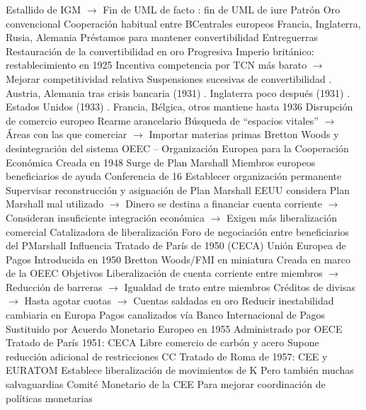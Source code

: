 \documentclass{nuevotema}
\begin{document}
\begin{esquemal}
				\4[] Estallido de IGM
				\4[] $\to$ Fin de UML de facto
				: fin de UML de iure
			\3 Patrón Oro convencional
				\4 Cooperación habitual entre BCentrales europeos
				\4 Francia, Inglaterra, Rusia, Alemania
				\4[] Préstamos para mantener convertibilidad
			\3 Entreguerras
				\4 Restauración de la convertibilidad en oro
				\4[] Progresiva
				\4[] Imperio británico: restablecimiento en 1925
				\4[] Incentiva competencia por TCN más barato
				\4[] $\to$ Mejorar competitividad relativa
				\4 Suspensiones sucesivas de convertibilidad
				. Austria, Alemania tras crisis bancaria (1931)
				. Inglaterra poco después (1931)
				. Estados Unidos (1933)
				. Francia, Bélgica, otros mantiene hasta 1936
				\4 Disrupción de comercio europeo
				\4[] Rearme arancelario
				\4[] Búsqueda de ``espacios vitales''
				\4[] $\to$ Áreas con las que comerciar
				\4[] $\to$ Importar materias primas
		\2 Bretton Woods y desintegración del sistema
			\3 OEEC -- Organización Europea para la Cooperación Económica
				\4 Creada en 1948
				\4 Surge de Plan Marshall
				\4[] Miembros europeos beneficiarios de ayuda
				\4 Conferencia de 16
				\4[] Establecer organización permanente
				\4[] Supervisar reconstrucción y asignación de Plan Marshall
				\4[] EEUU considera Plan Marshall mal utilizado
				\4[] $\to$ Dinero se destina a financiar cuenta corriente
				\4[] $\to$ Consideran insuficiente integración económica
				\4[] $\to$ Exigen más liberalización comercial
				\4 Catalizadora de liberalización
				\4[] Foro de negociación entre beneficiarios del PMarshall
				\4[] Influencia Tratado de París de 1950 (CECA)
			\3 Unión Europea de Pagos
				\4 Introducida en 1950
				\4 Bretton Woods/FMI en miniatura
				\4 Creada en marco de la OEEC
				\4 Objetivos
				\4[] Liberalización de cuenta corriente entre miembros
				\4[] $\to$ Reducción de barreras
				\4[] $\to$ Igualdad de trato entre miembros
				\4[] Créditos de divisas
				\4[] $\to$ Hasta agotar cuotas
				\4[] $\to$ Cuentas saldadas en oro
				\4[$\then$] Reducir inestabilidad cambiaria en Europa
				\4 Pagos canalizados vía Banco Internacional de Pagos
				\4 Sustituido por Acuerdo Monetario Europeo en 1955
				\4[] Administrado por OECE
			\3 Tratado de París 1951: CECA
				\4 Libre comercio de carbón y acero
				\4 Supone reducción adicional de restricciones CC
			\3 Tratado de Roma de 1957: CEE y EURATOM
				\4 Establece liberalización de movimientos de K
				\4[] Pero también muchas salvaguardias
				\4 Comité Monetario de la CEE
				\4[] Para mejorar coordinación de políticas monetarias

\end{esquemal}
\end{document}
